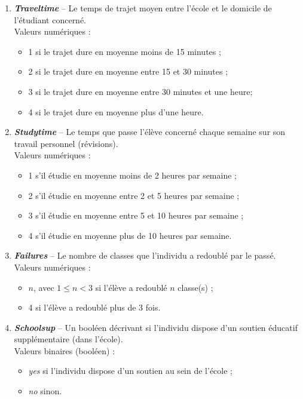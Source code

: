 \documentclass[11pt]{article}
\begin{document}
\begin{enumerate}
 \item \textbf{\emph{Traveltime}} \--- Le temps de trajet moyen entre l'école et le domicile de l'étudiant concerné. 
	\\\textsf{Valeurs numériques : }\begin{itemize}
	\item[\textbullet] 1 si le trajet dure en moyenne moins de 15 minutes ;
	\item[\textbullet] 2 si le trajet dure en moyenne entre 15 et 30 minutes ;
	\item[\textbullet] 3 si le trajet dure en moyenne entre 30 minutes et une heure;
	\item[\textbullet] 4 si le trajet dure en moyenne plus d'une heure.
	\end{itemize}

\item \textbf{\emph{Studytime}} \--- Le temps que passe l'élève concerné chaque semaine sur son travail personnel (révisions). 
	\\\textsf{Valeurs numériques : }\begin{itemize}
	\item[\textbullet] 1 s'il étudie en moyenne moins de 2 heures par semaine ;
	\item[\textbullet] 2 s'il étudie en moyenne entre 2 et 5 heures par semaine ;
	\item[\textbullet] 3 s'il étudie en moyenne entre 5 et 10 heures par semaine ;
	\item[\textbullet] 4 s'il étudie en moyenne plus de 10 heures par semaine.
	\end{itemize}
	
\item \textbf{\emph{Failures}} \--- Le nombre de classes que l'individu a redoublé par le passé. 
	\\\textsf{Valeurs numériques : }\begin{itemize}
	\item[\textbullet] $n$, avec $1\leq n <3$ si l'élève a redoublé $n$ classe(s) ;
	\item[\textbullet] 4 si l'élève a redoublé plus de 3 fois.
	\end{itemize}

\item \textbf{\emph{Schoolsup}} \--- Un booléen décrivant si l'individu dispose d'un soutien éducatif supplémentaire (dans l'école). 
	\\\textsf{Valeurs binaires (booléen) : }\begin{itemize}
	\item[\textbullet] \emph{yes} si l'individu dispose d'un soutien au sein de l'école ;
	\item[\textbullet] \emph{no} sinon.
	\end{itemize}


\end{enumerate}
\end{document}
